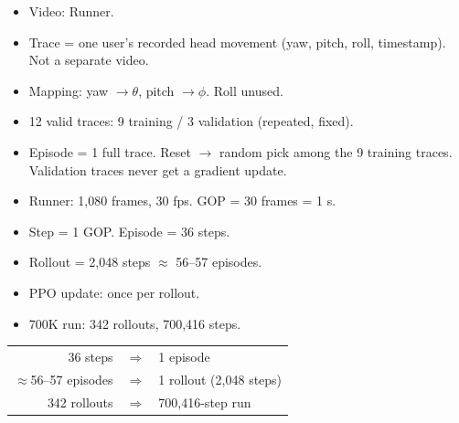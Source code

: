 \documentclass[aspectratio=169]{beamer}
\begin{document}
\begin{frame}
\begin{itemize}
  \item Video: Runner.
  \item Trace = one user's recorded head movement (yaw, pitch, roll, timestamp). Not a separate video.
  \item Mapping: yaw $\to\theta$, pitch $\to\phi$. Roll unused.
  \item 12 valid traces: 9 training / 3 validation (repeated, fixed).
  \item Episode = 1 full trace. Reset $\to$ random pick among the 9 training traces. Validation traces never get a gradient update.
\end{itemize}

\vspace{10pt}
\begin{center}
\end{center}
\end{frame}

\begin{frame}
\begin{itemize}
  \item Runner: 1{,}080 frames, 30 fps. GOP = 30 frames = 1 s.
  \item Step = 1 GOP. Episode = 36 steps.
  \item Rollout = 2{,}048 steps $\approx$ 56--57 episodes.
  \item PPO update: once per rollout.
  \item 700K run: 342 rollouts, 700{,}416 steps.
\end{itemize}

\vspace{10pt}
\begin{center}\small
\begin{tabular}{r c l}
36 steps & $\Rightarrow$ & 1 episode \\[4pt]
$\approx$56--57 episodes & $\Rightarrow$ & 1 rollout (2{,}048 steps) \\[4pt]
342 rollouts & $\Rightarrow$ & 700{,}416-step run \\
\end{tabular}
\end{center}
\end{frame}
\end{document}
